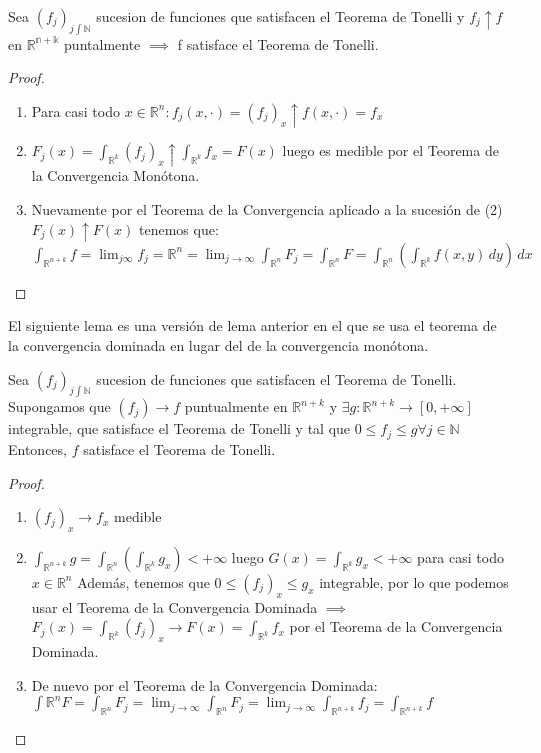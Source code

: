 \begin{lema}
    Sea $(f_j)_{j\int\mathbb{N}}$ sucesion de funciones que satisfacen el Teorema de Tonelli y $f_j \uparrow f$ en $\mathbb{R^{n+k}}$ puntalmente $\implies$ f satisface el Teorema de Tonelli.
\end{lema}
\begin{proof}
    \begin{enumerate}
        \item Para casi todo $x \in \mathbb{R}^{n} : f_j(x, \cdot) = (f_j)_x \uparrow f(x, \cdot) = f_x$ 
        \item $F_j(x) = \int_{\mathbb{R}^k}(f_j)_x \uparrow \int_{\mathbb{R}^k}f_x = F(x)$ luego es medible por el Teorema de la Convergencia Monótona. 
        \item Nuevamente por el Teorema de la Convergencia aplicado a la sucesión de (2) $F_j(x) \uparrow F(x)$ tenemos que: $\int_{\mathbb{R}^{n+k}}f = \lim_{j \infty}f_j = \mathbb{R}^n = \lim_{j \to \infty}\int_{\mathbb{R}^n}F_j = \int_{\mathbb{R}^n}F = \int_{\mathbb{R}^n}(\int_{\mathbb{R}^k}f(x,y) \,dy)\,dx$
    \end{enumerate}
\end{proof}
\begin{observación}
    El siguiente lema es una versión de lema anterior en el que se usa el teorema de la convergencia dominada en lugar del de la convergencia monótona. 
\end{observación}
\begin{lema}
    Sea $(f_j)_{j\int\mathbb{N}}$ sucesion de funciones que satisfacen el Teorema de Tonelli. Supongamos que $(f_j)\to f$ puntualmente en $\mathbb{R}^{n+k}$ y $\exists g: \mathbb{R}^{n+k} \to [0, +\infty]$ integrable, que satisface el Teorema de Tonelli y tal que $ 0 \leq f_j \leq g \forall j \in \mathbb{N}$ Entonces, $f$ satisface el Teorema de Tonelli. 
\end{lema}
\begin{proof}
    \begin{enumerate}
        \item $(f_j)_x \to f_x$ medible
        \item $\int_{\mathbb{R}^{n+k}}g = \int_{\mathbb{R}^n}(\int_{\mathbb{R}^k}g_x) < +\infty$ luego $G(x) = \int_{\mathbb{R}^k}g_x < +\infty$ para casi todo $x \in \mathbb{R}^n$
        Además, tenemos que $0 \leq (f_j)_x \leq g_x$ integrable, por lo que podemos usar el Teorema de la Convergencia Dominada $\implies$
        $F_j(x) = \int_{\mathbb{R}^k}(f_j)_x \to F(x) = \int_{\mathbb{R}^k}f_x$ por el Teorema de la Convergencia Dominada. 
        \item De nuevo por el Teorema de la Convergencia Dominada: $\int{\mathbb{R}^n}F = \int_{\mathbb{R}^n}F_j = \lim_{j \to \infty}\int_{\mathbb{R}^n}F_j = \lim_{j \to \infty}\int_{\mathbb{R}^{n+k}}f_j = \int_{\mathbb{R}^{n+k}}f$
    \end{enumerate}
\end{proof}


